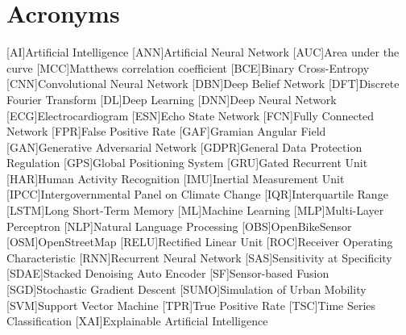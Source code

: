 
\cleardoublepage
\chapter{Acronyms}

\acresetall

\begin{acronym}[Bash]
	[AI]{Artificial Intelligence}
	[ANN]{Artificial Neural Network}
	[AUC]{Area under the curve}
	[MCC]{Matthews correlation coefficient}
	[BCE]{Binary Cross-Entropy}
	[CNN]{Convolutional Neural Network}
	[DBN]{Deep Belief Network}
	[DFT]{Discrete Fourier Transform}
	[DL]{Deep Learning}
	[DNN]{Deep Neural Network}
	[ECG]{Electrocardiogram}
	[ESN]{Echo State Network}
	[FCN]{Fully Connected Network}
	[FPR]{False Positive Rate}
	[GAF]{Gramian Angular Field}
	[GAN]{Generative Adversarial Network}
	[GDPR]{General Data Protection Regulation}
	[GPS]{Global Positioning System}
	[GRU]{Gated Recurrent Unit}
	[HAR]{Human Activity Recognition}
	[IMU]{Inertial Measurement Unit}
	[IPCC]{Intergovernmental Panel on Climate Change}
	[IQR]{Interquartile Range}
	[LSTM]{Long Short-Term Memory}	
	[ML]{Machine Learning}
	[MLP]{Multi-Layer Perceptron}
	[NLP]{Natural Language Processing}
	[OBS]{OpenBikeSensor}
	[OSM]{OpenStreetMap}
	[RELU]{Rectified Linear Unit}
	[ROC]{Receiver Operating Characteristic}
	[RNN]{Recurrent Neural Network}
	[SAS]{Sensitivity at Specificity}
	[SDAE]{Stacked Denoising Auto Encoder}
	[SF]{Sensor-based Fusion}
	[SGD]{Stochastic Gradient Descent}
	[SUMO]{Simulation of Urban Mobility}
	[SVM]{Support Vector Machine}
	[TPR]{True Positive Rate}
	[TSC]{Time Series Classification}
	[XAI]{Explainable Artificial Intelligence}
\end{acronym}

\acresetall